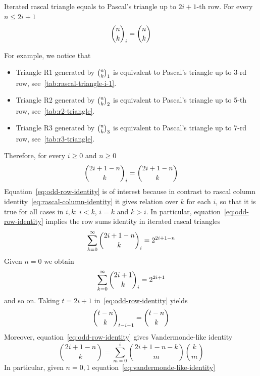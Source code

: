 \begin{proposition}
    \label{prop:odd-row-proposition}
    Iterated rascal triangle equals to Pascal's triangle up to $2i+1$-th row.
    For every $n \leq 2i+1$
    \begin{align*}
        \binom{n}{k}_{i} = \binom{n}{k}
    \end{align*}
\end{proposition}
For example, we notice that
\begin{itemize}
    \item Triangle R1 generated by $\binom{n}{k}_{1}$ is equivalent to Pascal's triangle up to 3-rd row, see~\eqref{tab:rascal-triangle-i-1}.
    \item Triangle R2 generated by $\binom{n}{k}_{2}$ is equivalent to Pascal's triangle up to 5-th row, see~\eqref{tab:r2-triangle}.
    \item Triangle R3 generated by $\binom{n}{k}_{3}$ is equivalent to Pascal's triangle up to 7-rd row, see~\eqref{tab:r3-triangle}.
\end{itemize}
Therefore, for every $i \geq 0$ and $n \geq 0$
\begin{equation}
    \binom{2i+1-n}{k}_{i} = \binom{2i+1-n}{k}
    \label{eq:odd-row-identity}
\end{equation}
Equation~\eqref{eq:odd-row-identity} is of interest because in contrast to rascal
column identity~\eqref{eq:rascal-column-identity} it gives relation over $k$ for each $i$,
so that it is true for all cases in $i,k$: $i < k$, $i=k$ and $k >i$.
In particular, equation~\eqref{eq:odd-row-identity} implies the row sums identity in iterated rascal triangles
\begin{align*}
    \sum_{k=0}^{\infty} \binom{2i+1-n}{k}_{i} = 2^{2i+1-n}
\end{align*}
Given $n=0$ we obtain
\begin{align*}
    \sum_{k=0}^{\infty} \binom{2i+1}{k}_{i} = 2^{2i+1}
\end{align*}
and so on.
Taking $t=2i+1$ in~\eqref{eq:odd-row-identity} yields
\begin{align*}
    \binom{t-n}{k}_{t-i-1}= \binom{t-n}{k}
\end{align*}
Moreover, equation~\eqref{eq:odd-row-identity} gives Vandermonde-like identity
\begin{equation}
    \binom{2i+1-n}{k} = \sum_{m=0}^{i} \binom{2i+1-n-k}{m} \binom{k}{m}
    \label{eq:vandermonde-like-identity}
\end{equation}
In particular, given $n=0,1$ equation~\eqref{eq:vandermonde-like-identity}
